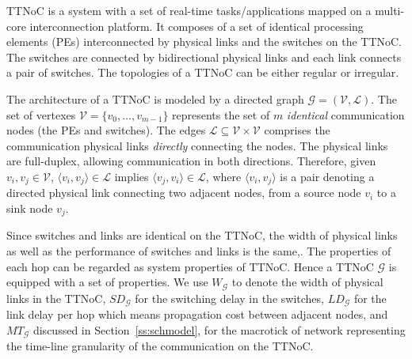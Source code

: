 \documentclass[journal]{IEEEtran}
\newcommand{\calG}{\mathcal{G}}
\newcommand{\calV}{\mathcal{V}}
\newcommand{\calL}{\mathcal{L}}
\newcommand{\width}{\mathit{W}_\calG}
\newcommand{\SD}{\mathit{SD}_\calG}
\newcommand{\HD}{\mathit{LD}_\calG}
\newcommand{\MT}{\mathit{MT}_\calG}
\theoremstyle{remark}
\begin{document}
TTNoC is a system with a set of real-time tasks/applications mapped on a multi-core interconnection platform. 
It composes of a set of identical processing elements (PEs) interconnected by physical links and the switches on the TTNoC.
The switches are connected by bidirectional physical links and each link connects a pair of switches.  
The topologies of a TTNoC can be either regular or irregular.

The architecture of a TTNoC is modeled by a directed graph $\calG=(\calV,\calL)$. 
The set of vertexes $\mathcal{V}=\{ v_{0},\dots,v_{m-1}\}$ represents the set of $m$ \emph{identical} communication nodes (the PEs and switches).
The edges $\mathcal{L}\subseteq \mathcal{V} \times\mathcal{V}$ comprises the communication physical links \emph{directly} connecting the nodes.
The physical links are full-duplex, allowing communication in both directions. 
Therefore, given $v_i,v_j\in\calV$, $\langle v_i,v_j\rangle \in\calL$ implies $\langle v_j,v_i\rangle\in\calL$,
 where $\langle v_i,v_j\rangle$ is a pair denoting a directed physical link connecting two adjacent nodes,
  from a source node $v_i$ to a sink node $v_j$.

Since switches and links are identical on the TTNoC,
 the width of physical links as well as the performance of switches and links is the same,.
The properties of each hop can be regarded as system properties of TTNoC.
Hence a TTNoC $\calG$ is equipped with a set of properties. 
We use $\width$ to denote the width of physical links in the TTNoC,
 $\SD$ for the switching delay in the switches,
  $\HD$ for the link delay per hop which means propagation cost between adjacent nodes,
   and $\MT$ discussed in Section~\ref{ss:schmodel}, for the macrotick of network representing the time-line granularity of the communication on the TTNoC.

\end{document}
